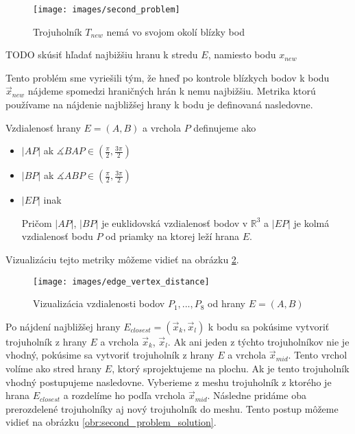 \begin{figure}
    \centerline{\texttt{[image: images/second\_problem]}}
    \caption[Trojuholník $T_{new}$ nemá vo svojom okolí blízky bod]{Trojuholník $T_{new}$ nemá vo svojom okolí blízky bod}
    \label{obr:second_problem}
\end{figure}



TODO skúsiť hľadať najbižšiu hranu k stredu $E$, namiesto bodu $x_{new}$

Tento problém sme vyriešili tým, že hneď po kontrole blízkych bodov k bodu 
$\overrightarrow{x}_{new}$ nájdeme spomedzi hraničných hrán k nemu najbižšiu. 
Metrika ktorú používame na nájdenie najbližšej hrany k bodu je definovaná nasledovne.

\begin{definition} Vzdialenosť hrany $E=(A,B)$ a vrchola $P$ definujeme ako
\begin{itemize}
    \item{
        $|AP|$ ak $\measuredangle BAP \in (\frac{\pi}{2}, \frac{3\pi}{2})$
    }

    \item{
        $|BP|$ ak $\measuredangle ABP \in (\frac{\pi}{2}, \frac{3\pi}{2})$
    }

    \item{
        $|EP|$ inak
    }

    
    Pričom $|AP|$, $|BP|$ je euklidovská vzdialenosť bodov v $\mathbb{R}^3$ a $|EP|$ je kolmá 
    vzdialenosť bodu $P$ od priamky na ktorej leží hrana $E$.
\end{itemize}

\end{definition}

Vizualizáciu tejto metriky môžeme vidieť na obrázku \ref{obr:edge_vertex_distance}.

\begin{figure}
    \centerline{\texttt{[image: images/edge\_vertex\_distance]}}
    \caption[Vizualizácia vzdialenosti bodov $P_1, ..., P_8$ od hrany $E=(A,B)$]
    {Vizualizácia vzdialenosti bodov $P_1, ..., P_8$ od hrany $E=(A,B)$}
    \label{obr:edge_vertex_distance}
\end{figure}

Po nájdení najbližšej hrany $E_{closest} = (\overrightarrow{x}_k, \overrightarrow{x}_l)$ 
k bodu sa pokúsime vytvoriť trojuholník z hrany $E$ a vrchola $\overrightarrow{x}_k$, 
$\overrightarrow{x}_l$. Ak ani jeden z týchto trojuholníkov nie je vhodný, pokúsime sa 
vytvoriť trojuholník z hrany $E$ a vrchola $\overrightarrow{x}_{mid}$. Tento vrchol 
volíme ako stred hrany $E$, ktorý sprojektujeme na plochu. Ak je tento trojuholník vhodný
postupujeme nasledovne. Vyberieme z meshu trojuholník z ktorého je hrana $E_{closest}$ a
rozdelíme ho podľa vrchola $\overrightarrow{x}_{mid}$. Následne pridáme oba prerozdelené
trojuholníky aj nový trojuholník do meshu. Tento postup môžeme vidieť na obrázku 
\ref{obr:second_problem_solution}.

